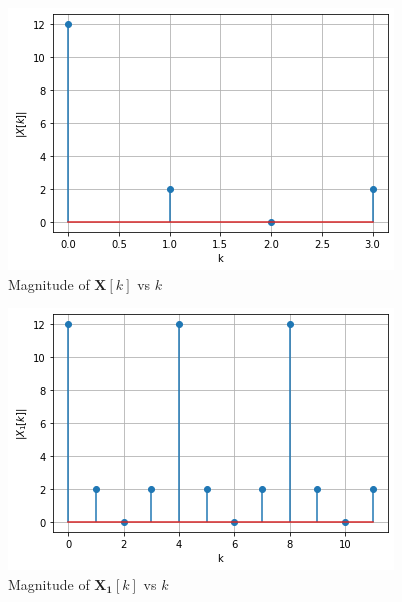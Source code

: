 \documentclass{beamer}
\renewcommand{\vec}[1]{\mathbf{#1}}
\begin{document}
\begin{frame}
\begin{figure}[!ht]
    \centering
    \includegraphics[width=0.9\columnwidth] {Gate_Assignment_1_Fig_1.png}
    \caption{Magnitude of $\vec{X}[k]$ vs $k$}
    \label{Magnitude of X[k]}
\end{figure}
\end{frame}

\begin{frame}
\begin{figure}[!ht]
    \centering
    \includegraphics[width=0.9\columnwidth] {Gate_Assignment_1_Fig_2.png}
    \caption{Magnitude of $\vec{X_{1}}[k]$ vs $k$}
    \label{Magnitude of X1[k]}
\end{figure}
\end{frame}
\end{document}

